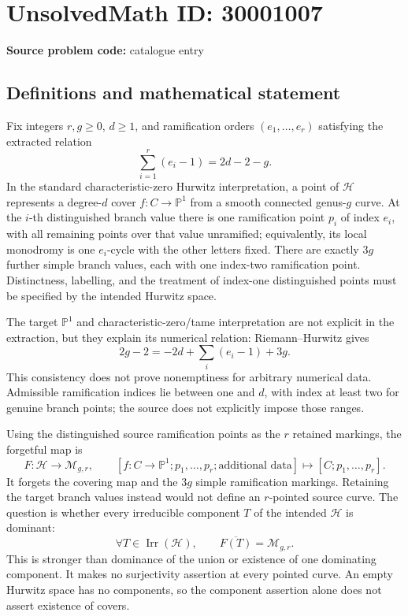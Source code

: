 \documentclass[11pt]{article}
\newcommand{\PP}{\mathbb{P}}
\begin{document}
\section*{UnsolvedMath ID: 30001007}
\textbf{Source problem code:} catalogue entry
\subsection{Definitions and mathematical statement}
Fix integers \(r,g\geq0\), \(d\geq1\), and ramification orders \((e_1,\ldots,e_r)\) satisfying the extracted relation
\[
 \sum_{i=1}^r(e_i-1)=2d-2-g.
\]
In the standard characteristic-zero Hurwitz interpretation, a point of \(\mathcal H\) represents a degree-\(d\) cover \(f:C\to\PP^1\) from a smooth connected genus-\(g\) curve. At the \(i\)-th distinguished branch value there is one ramification point \(p_i\) of index \(e_i\), with all remaining points over that value unramified; equivalently, its local monodromy is one \(e_i\)-cycle with the other letters fixed. There are exactly \(3g\) further simple branch values, each with one index-two ramification point. Distinctness, labelling, and the treatment of index-one distinguished points must be specified by the intended Hurwitz space.

The target \(\PP^1\) and characteristic-zero/tame interpretation are not explicit in the extraction, but they explain its numerical relation: Riemann--Hurwitz gives
\[
 2g-2=-2d+\sum_i(e_i-1)+3g.
\]
This consistency does not prove nonemptiness for arbitrary numerical data. Admissible ramification indices lie between one and \(d\), with index at least two for genuine branch points; the source does not explicitly impose those ranges.

Using the distinguished source ramification points as the \(r\) retained markings, the forgetful map is
\[
 F:\mathcal H\longrightarrow\mathcal M_{g,r},\qquad
 [f:C\to\PP^1;p_1,\ldots,p_r;\text{additional data}]
 \longmapsto[C;p_1,\ldots,p_r].
\]
It forgets the covering map and the \(3g\) simple ramification markings. Retaining the target branch values instead would not define an \(r\)-pointed source curve. The question is whether every irreducible component \(T\) of the intended \(\mathcal H\) is dominant:
\[
 \forall T\in\operatorname{Irr}(\mathcal H),\qquad
 \overline{F(T)}=\mathcal M_{g,r}.
\]
This is stronger than dominance of the union or existence of one dominating component. It makes no surjectivity assertion at every pointed curve. An empty Hurwitz space has no components, so the component assertion alone does not assert existence of covers.
\end{document}
